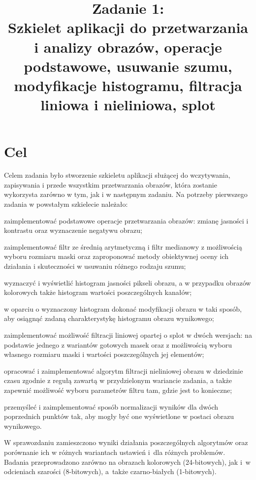 \documentclass{classrep}
\author{
  \studentinfo{Paweł Musiał}{178726} \and
  \studentinfo{Łukasz Michalski}{178724}
}
\title{Zadanie 1:\\  \textbf {Szkielet aplikacji do przetwarzania \\i analizy obrazów, operacje podstawowe, usuwanie szumu, modyfikacje histogramu, filtracja liniowa i nieliniowa, splot}}
\begin{document}
\maketitle

\addtocounter{footnote}{1}

\section{Cel}

Celem zadania było stworzenie szkieletu aplikacji służącej do wczytywania, zapisywania i przede wszystkim przetwarzania obrazów, która zostanie wykorzysta zarówno w tym, jak i w następnym zadaniu. Na potrzeby pierwszego zadania w powstałym szkielecie należało:

\begin{list}{•}{}
\item zaimplementować podstawowe operacje przetwarzania obrazów: zmianę jasności i kontrastu oraz wyznaczenie negatywu obrazu;
\item zaimplementować filtr ze średnią arytmetyczną i filtr medianowy z możliwością wyboru rozmiaru maski oraz zaproponować metody obiektywnej oceny ich działania i skuteczności w usuwaniu różnego rodzaju szumu;
\item wyznaczyć i wyświetlić histogram jasności pikseli obrazu, a w przypadku
obrazów kolorowych także histogram wartości poszczególnych kanałów;
\item w oparciu o wyznaczony histogram dokonać modyfikacji obrazu w taki sposób, aby osiągnąć zadaną charakterystykę histogramu obrazu wynikowego;
\item zaimplementować możliwość filtracji liniowej opartej o splot w dwóch wersjach: na podstawie jednego z wariantów gotowych masek oraz z możliwością wyboru własnego rozmiaru maski i wartości poszczególnych jej elementów;
\item opracować i zaimplementować algorytm filtracji nieliniowej obrazu w dziedzinie czasu zgodnie z regułą zawartą w przydzielonym wariancie zadania, a także zapewnić możliwość wyboru parametrów filtru tam, gdzie jest to konieczne;
\item przemyśleć i zaimplementować sposób normalizacji wyników dla dwóch poprzednich punktów tak, aby mogły być one wyświetlone w postaci obrazu wynikowego.
\end{list}

W sprawozdaniu zamieszczono wyniki działania poszczególnych algorytmów oraz porównanie ich w różnych wariantach ustawień i~dla różnych problemów. Badania przeprowadzono zarówno na obrazach kolorowych (24-bitowych), jak i~w odcieniach szarości (8-bitowych), a~także czarno-białych (1-bitowych). 
\end{document}
